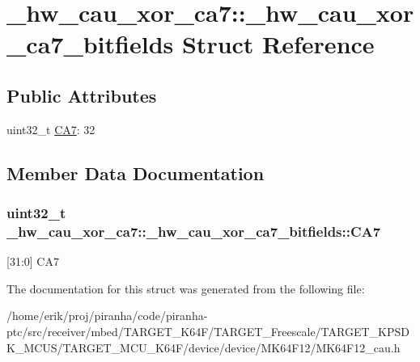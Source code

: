 \hypertarget{struct__hw__cau__xor__ca7_1_1__hw__cau__xor__ca7__bitfields}{}\section{\+\_\+hw\+\_\+cau\+\_\+xor\+\_\+ca7\+:\+:\+\_\+hw\+\_\+cau\+\_\+xor\+\_\+ca7\+\_\+bitfields Struct Reference}
\label{struct__hw__cau__xor__ca7_1_1__hw__cau__xor__ca7__bitfields}
\subsection*{Public Attributes}
\begin{DoxyCompactItemize}
\item 
uint32\+\_\+t \hyperlink{struct__hw__cau__xor__ca7_1_1__hw__cau__xor__ca7__bitfields_ad02f6900ff37a57b3f576f43dc369cc8}{C\+A7}\+: 32
\end{DoxyCompactItemize}


\subsection{Member Data Documentation}
\subsubsection[{\texorpdfstring{C\+A7}{CA7}}]{\setlength{\rightskip}{0pt plus 5cm}uint32\+\_\+t \+\_\+hw\+\_\+cau\+\_\+xor\+\_\+ca7\+::\+\_\+hw\+\_\+cau\+\_\+xor\+\_\+ca7\+\_\+bitfields\+::\+C\+A7}\hypertarget{struct__hw__cau__xor__ca7_1_1__hw__cau__xor__ca7__bitfields_ad02f6900ff37a57b3f576f43dc369cc8}{}\label{struct__hw__cau__xor__ca7_1_1__hw__cau__xor__ca7__bitfields_ad02f6900ff37a57b3f576f43dc369cc8}
\mbox{[}31\+:0\mbox{]} C\+A7 

The documentation for this struct was generated from the following file\+:\begin{DoxyCompactItemize}
\item 
/home/erik/proj/piranha/code/piranha-\/ptc/src/receiver/mbed/\+T\+A\+R\+G\+E\+T\+\_\+\+K64\+F/\+T\+A\+R\+G\+E\+T\+\_\+\+Freescale/\+T\+A\+R\+G\+E\+T\+\_\+\+K\+P\+S\+D\+K\+\_\+\+M\+C\+U\+S/\+T\+A\+R\+G\+E\+T\+\_\+\+M\+C\+U\+\_\+\+K64\+F/device/device/\+M\+K64\+F12/M\+K64\+F12\+\_\+cau.\+h\end{DoxyCompactItemize}
